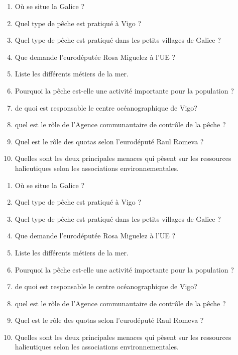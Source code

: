 \documentclass[12pt]{article}
\begin{document}
\begin{enumerate}
\item Où se situe la Galice ?
\item Quel type de pêche est pratiqué à Vigo ?
\item Quel type de pêche est pratiqué dans les petits villages de Galice ?
 \item Que demande l'eurodéputée Rosa Miguelez à l'UE ?
\item Liste les différents métiers de la mer.
\item Pourquoi la pêche est-elle une activité importante pour la population ?
\item de quoi est responsable le centre océanographique de Vigo?
\item quel est le rôle de l'Agence communautaire de contrôle de la pêche ?
\item Quel est le rôle des quotas  selon l'eurodéputé Raul Romeva ?
\item Quelles sont les deux principales menaces qui pèsent sur les ressources halieutiques selon les associations environnementales.
\end{enumerate}

\vfill

\begin{enumerate}
\item Où se situe la Galice ?
\item Quel type de pêche est pratiqué à Vigo ?
\item Quel type de pêche est pratiqué dans les petits villages de Galice ?
 \item Que demande l'eurodéputée Rosa Miguelez à l'UE ?
\item Liste les différents métiers de la mer.
\item Pourquoi la pêche est-elle une activité importante pour la population ?
\item de quoi est responsable le centre océanographique de Vigo?
\item quel est le rôle de l'Agence communautaire de contrôle de la pêche ?
\item Quel est le rôle des quotas  selon l'eurodéputé Raul Romeva ?
\item Quelles sont les deux principales menaces qui pèsent sur les ressources halieutiques selon les associations environnementales.
\end{enumerate}
\end{document}
